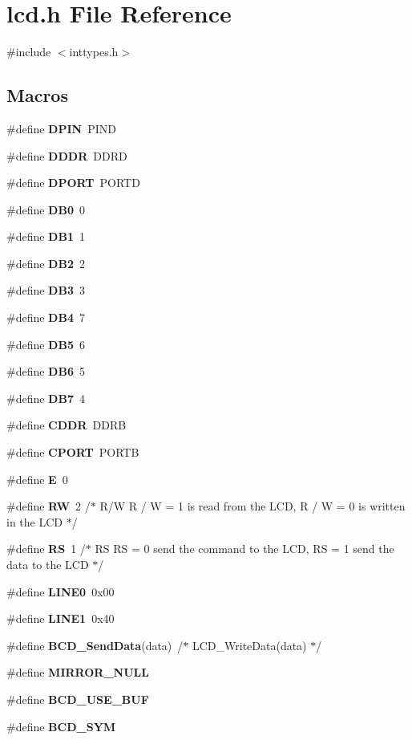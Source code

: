 \section{lcd.\+h File Reference}
\label{lcd_8h}
{\ttfamily \#include $<$inttypes.\+h$>$}\newline
\subsection*{Macros}
\begin{DoxyCompactItemize}
\item 
\#define \textbf{ D\+P\+IN}~P\+I\+ND
\item 
\#define \textbf{ D\+D\+DR}~D\+D\+RD
\item 
\#define \textbf{ D\+P\+O\+RT}~P\+O\+R\+TD
\item 
\#define \textbf{ D\+B0}~0
\item 
\#define \textbf{ D\+B1}~1
\item 
\#define \textbf{ D\+B2}~2
\item 
\#define \textbf{ D\+B3}~3
\item 
\#define \textbf{ D\+B4}~7
\item 
\#define \textbf{ D\+B5}~6
\item 
\#define \textbf{ D\+B6}~5
\item 
\#define \textbf{ D\+B7}~4
\item 
\#define \textbf{ C\+D\+DR}~D\+D\+RB
\item 
\#define \textbf{ C\+P\+O\+RT}~P\+O\+R\+TB
\item 
\#define \textbf{ E}~0
\item 
\#define \textbf{ RW}~2   	/$\ast$ R/W		R / W = 1 is read from the L\+CD, R / W = 0 is written in the L\+CD		$\ast$/
\item 
\#define \textbf{ RS}~1 	/$\ast$ RS		RS = 0 send the command to the L\+CD, RS = 1 send the data to the L\+CD	$\ast$/
\item 
\#define \textbf{ L\+I\+N\+E0}~0x00
\item 
\#define \textbf{ L\+I\+N\+E1}~0x40
\item 
\#define \textbf{ B\+C\+D\+\_\+\+Send\+Data}(data)~/$\ast$ L\+C\+D\+\_\+\+Write\+Data(data) $\ast$/
\item 
\#define \textbf{ M\+I\+R\+R\+O\+R\+\_\+\+N\+U\+LL}
\item 
\#define \textbf{ B\+C\+D\+\_\+\+U\+S\+E\+\_\+\+B\+UF}
\item 
\#define \textbf{ B\+C\+D\+\_\+\+S\+YM}
\end{DoxyCompactItemize}

